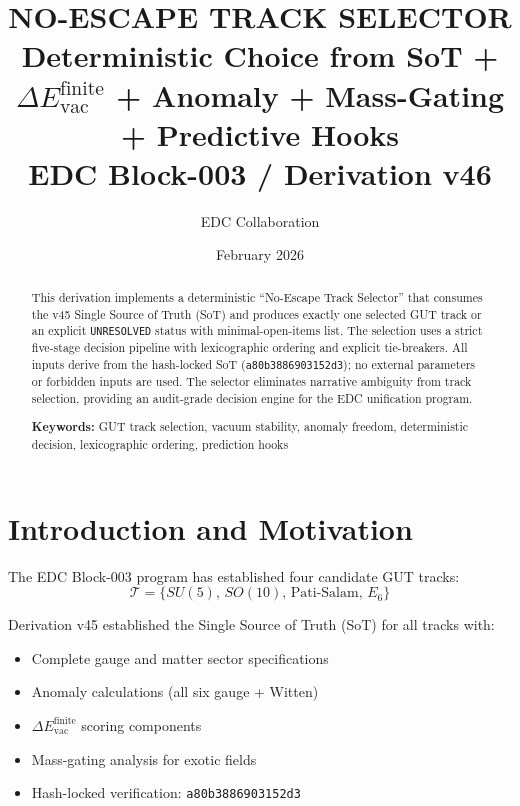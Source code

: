 \documentclass[11pt,a4paper]{article}
\title{\textbf{NO-ESCAPE TRACK SELECTOR}\\[0.5em]
\large Deterministic Choice from SoT + $\Delta E_{\text{vac}}^{\text{finite}}$ + Anomaly + Mass-Gating + Predictive Hooks\\[0.5em]
\normalsize EDC Block-003 / Derivation v46}
\author{EDC Collaboration}
\date{February 2026}
\begin{document}
\maketitle

\begin{abstract}
This derivation implements a deterministic ``No-Escape Track Selector'' that consumes
the v45 Single Source of Truth (SoT) and produces exactly one selected GUT track
or an explicit \texttt{UNRESOLVED} status with minimal-open-items list. The selection
uses a strict five-stage decision pipeline with lexicographic ordering and explicit
tie-breakers. All inputs derive from the hash-locked SoT (\texttt{a80b3886903152d3});
no external parameters or forbidden inputs are used. The selector eliminates narrative
ambiguity from track selection, providing an audit-grade decision engine for the
EDC unification program.

\textbf{Keywords:} GUT track selection, vacuum stability, anomaly freedom,
deterministic decision, lexicographic ordering, prediction hooks
\end{abstract}

\tableofcontents
\newpage

\section{Introduction and Motivation}
\label{sec:intro}

The EDC Block-003 program has established four candidate GUT tracks:
\begin{equation}
\label{eq:tracks-list}
\mathcal{T} = \{SU(5),\, SO(10),\, \text{Pati-Salam},\, E_6\}
\end{equation}

Derivation v45 established the Single Source of Truth (SoT) for all tracks with:
\begin{itemize}
\item Complete gauge and matter sector specifications
\item Anomaly calculations (all six gauge + Witten)
\item $\Delta E_{\text{vac}}^{\text{finite}}$ scoring components
\item Mass-gating analysis for exotic fields
\item Hash-locked verification: \texttt{a80b3886903152d3}
\end{itemize}
\end{document}
